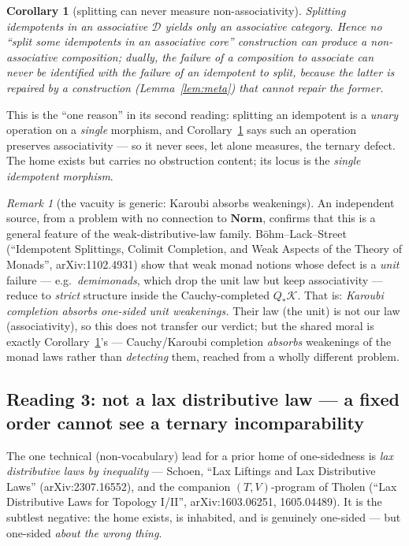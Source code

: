 \documentclass[11pt]{amsart}
\theoremstyle{plain}
\newtheorem{corollary}[theorem]{Corollary}
\theoremstyle{definition}
\theoremstyle{remark}
\newtheorem{remark}[theorem]{Remark}
\newcommand{\Norm}{\mathbf{Norm}}
\begin{document}
\begin{corollary}[splitting can never measure non-associativity]
\label{cor:orthogonal}
Splitting idempotents in an associative $\mathcal{D}$ yields only an \emph{associative} category.
Hence no ``split some idempotents in an associative core'' construction can \emph{produce} a
non-associative composition; dually, the failure of a composition to associate can never be
\emph{identified with} the failure of an idempotent to split, because the latter is repaired by a
construction (Lemma~\ref{lem:meta}) that cannot repair the former.
\end{corollary}

This is the ``one reason'' in its second reading: splitting an idempotent is a \emph{unary}
operation on a \emph{single} morphism, and Corollary~\ref{cor:orthogonal} says such an operation
preserves associativity --- so it never sees, let alone measures, the ternary defect. The home
exists but carries no obstruction content; its locus is the \emph{single idempotent morphism}.

\begin{remark}[the vacuity is generic: Karoubi absorbs weakenings]
\label{rem:bls}
An independent source, from a problem with no connection to $\Norm$, confirms that this is a general
feature of the weak-distributive-law family. B\"ohm--Lack--Street (``Idempotent Splittings, Colimit
Completion, and Weak Aspects of the Theory of Monads'', arXiv:1102.4931) show that weak monad
notions whose defect is a \emph{unit} failure --- e.g.\ \emph{demimonads}, which drop the unit law
but keep associativity --- reduce to \emph{strict} structure inside the Cauchy-completed
$Q_{*}\mathcal{K}$. That is: \emph{Karoubi completion absorbs one-sided unit weakenings.} Their law
(the unit) is not our law (associativity), so this does not transfer our verdict; but the shared
moral is exactly Corollary~\ref{cor:orthogonal}'s --- Cauchy/Karoubi completion \emph{absorbs}
weakenings of the monad laws rather than \emph{detecting} them, reached from a wholly different
problem.
\end{remark}

\subsection{Reading 3: not a lax distributive law --- a fixed order cannot see a ternary incomparability}
\label{sec:laxdl}

The one technical (non-vocabulary) lead for a prior home of one-sidedness is \emph{lax distributive
laws by inequality} --- Schoen, ``Lax Liftings and Lax Distributive Laws'' (arXiv:2307.16552), and
the companion $(T,V)$-program of Tholen (``Lax Distributive Laws for Topology I/II'',
arXiv:1603.06251, 1605.04489). It is the subtlest negative: the home exists, is inhabited, and is
genuinely one-sided --- but one-sided \emph{about the wrong thing}.
\end{document}

